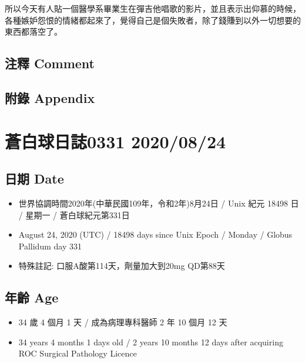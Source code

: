 \documentclass[
]{article}
\providecommand{\tightlist}{%
  \setlength{\itemsep}{0pt}\setlength{\parskip}{0pt}}
\begin{document}
所以今天有人貼一個醫學系畢業生在彈吉他唱歌的影片，並且表示出仰慕的時候，各種嫉妒怨恨的情緒都起來了，覺得自己是個失敗者，除了錢賺到以外一切想要的東西都落空了。

\hypertarget{ux6ce8ux91cb-comment-22}{%
\subsection{注釋 Comment}\label{ux6ce8ux91cb-comment-22}}

\hypertarget{ux9644ux9304-appendix-22}{%
\subsection{附錄 Appendix}\label{ux9644ux9304-appendix-22}}

\hypertarget{ux84bcux767dux7403ux65e5ux8a8c0331-20200824}{%
\section{蒼白球日誌0331
2020/08/24}\label{ux84bcux767dux7403ux65e5ux8a8c0331-20200824}}

\hypertarget{ux65e5ux671f-date-23}{%
\subsection{日期 Date}\label{ux65e5ux671f-date-23}}

\begin{itemize}
\tightlist
\item
  世界協調時間2020年(中華民國109年，令和2年)8月24日 / Unix 紀元 18498 日
  / 星期一 / 蒼白球紀元第331日
\item
  August 24, 2020 (UTC) / 18498 days since Unix Epoch / Monday / Globus
  Pallidum day 331
\item
  特殊註記: 口服A酸第114天，劑量加大到20mg QD第88天
\end{itemize}

\hypertarget{ux5e74ux9f61-age-23}{%
\subsection{年齡 Age}\label{ux5e74ux9f61-age-23}}

\begin{itemize}
\tightlist
\item
  34 歲 4 個月 1 天 / 成為病理專科醫師 2 年 10 個月 12 天
\item
  34 years 4 months 1 days old / 2 years 10 months 12 days after
  acquiring ROC Surgical Pathology Licence
\end{itemize}
\end{document}
